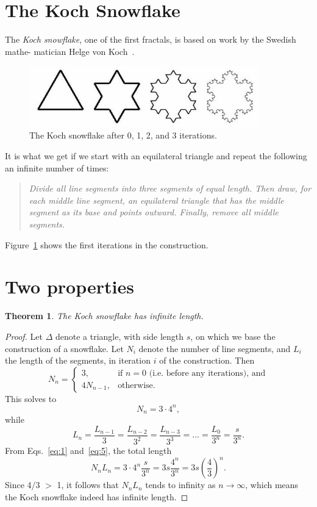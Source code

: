 \documentclass[12pt,a4paper]{article}
\newtheorem{theorem}{Theorem}
\begin{document}
\section{The Koch Snowflake}

The \emph{Koch snowflake},
one of the first fractals, is based on work by the Swedish mathe-
matician Helge von Koch~\cite{koch}.
\begin{figure}[h] \label{koch}
  \centering
	\includegraphics[width=10cm]{snowflake.jpg}
  \caption{The Koch snowflake after 0, 1, 2, and 3 iterations. }
\end{figure}
It is what we get if we start with an equilateral triangle    and repeat the following an infinite number of times:
\begin{quote}
\textit{Divide all line segments into three segments of equal length. Then draw, for each middle line segment, an equilateral triangle that has the middle segment as its base and points outward. Finally, remove all middle segments.}
\end{quote}
Figure~\ref{koch} shows the first iterations in the construction.
\section{Two properties}
\begin{theorem}
  The Koch snowflake has infinite length. 
\end{theorem}
\begin{proof}
  Let
  $\Delta$
  denote a triangle, with side length $s$, on which we base the construction of a snowflake.
  Let
  $N_i$ 
  denote the number of line segments, 
  and
  $L_i$ 
  the length of the segments, in iteration $i$ of the construction.
  Then
  \begin{displaymath}
    N_n =
    \begin{cases}
      3, &\text{if $n=0$ (i.e. before any iterations), and}\\4N_{n-1},&\text{otherwise.}
    \end{cases}
  \end{displaymath}
  This solves to
  \begin{equation}
    \label{eq:1}
    N_n = 3 \cdot 4^n,
  \end{equation}
   while  
  \begin{equation}
    \label{eq:5}
    L_n = \frac{L_{n-1}}{3} = \frac{L_{n-2}}{3^2} = \frac{L_{n-3}}{3^3} = \ldots = \frac{L_0}{3^n} = \frac{s}{3^n}.
  \end{equation}
  From Eqs.~\ref{eq:1}  and~\ref{eq:5}, the total length
  \begin{displaymath}
    N_nL_n = 3 \cdot 4^n\frac{s}{3^n} = 3s\frac{4^n}{3^n} = 3s\left(\frac{4}{3}\right)^n.
  \end{displaymath}
  Since 4$/$3 $>$ 1, it follows that $N_nL_n$ tends to infinity as $n \to \infty$, which means the Koch snowflake indeed has infinite length.
\end{proof}
\end{document}
